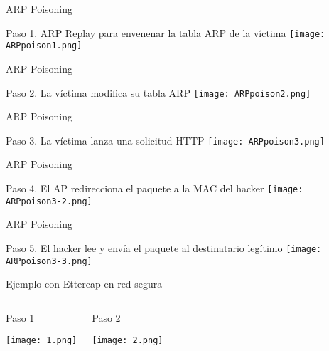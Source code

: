 \documentclass{beamer}
\begin{document}
\begin{frame}{ARP Poisoning}
\begin{block}{Paso 1. ARP Replay para envenenar la tabla ARP de la víctima}
\texttt{[image: ARPpoison1.png]}
\end{block}
\end{frame}

\begin{frame}{ARP Poisoning}
\begin{block}{Paso 2. La víctima modifica su tabla ARP}
\texttt{[image: ARPpoison2.png]}
\end{block}
\end{frame}

\begin{frame}{ARP Poisoning}
\begin{block}{Paso 3. La víctima lanza una solicitud HTTP}
\texttt{[image: ARPpoison3.png]}
\end{block}
\end{frame}

\begin{frame}{ARP Poisoning}
\begin{block}{Paso 4. El AP redirecciona el paquete a la MAC del hacker}
	\texttt{[image: ARPpoison3-2.png]}
\end{block}
\end{frame}

\begin{frame}{ARP Poisoning}
\begin{block}{Paso 5. El hacker lee y envía el paquete al destinatario legítimo}
	\texttt{[image: ARPpoison3-3.png]}
\end{block}
\end{frame}

\begin{frame}{Ejemplo con Ettercap en red segura}
\begin{columns}

\begin{block}{Paso 1}
	\begin{center}
		\texttt{[image: 1.png]}
	\end{center}
\end{block}
\begin{block}{Paso 2}
	\begin{center}
		\texttt{[image: 2.png]}
	\end{center}
\end{block}
\end{columns}
\end{frame}
\end{document}
